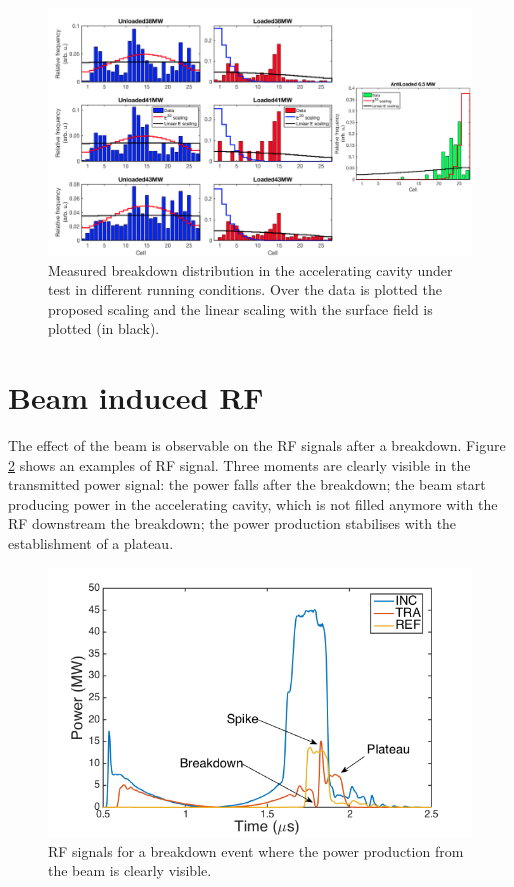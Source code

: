\begin{landscape}

\begin{figure}[h]
\centering 
\includegraphics[scale=0.53]{pictures/distro_all.png}
\caption{Measured breakdown distribution in the accelerating cavity under test in different running conditions. Over the data is plotted the proposed scaling and the linear scaling with the surface field is plotted (in black).}
\label{BD_distro}
\end{figure}
 
\end{landscape}





\section[Beam induced RF]{Beam induced RF}

The effect of the beam is observable on the RF signals after a breakdown. Figure \ref{BI_rf_fig} shows an examples of RF signal. Three moments are clearly visible in the transmitted power signal: the power falls after the breakdown; the beam start producing power in the accelerating cavity, which is not filled anymore with the RF downstream the breakdown; the power production stabilises with the establishment of a plateau. 

\begin{figure}[h]
\centering 
\includegraphics[scale=0.4]{pictures/BI_rf.png}
\caption{RF signals for a breakdown event where the power production from the beam is clearly visible.}
\label{BI_rf_fig}
\end{figure}

